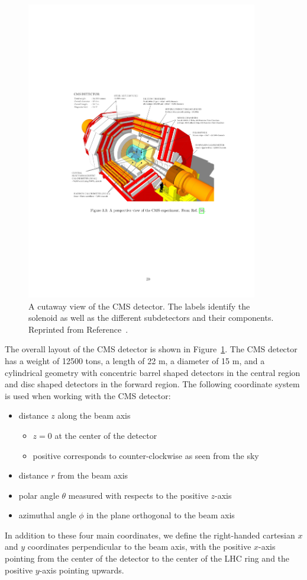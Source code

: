 \begin{figure}[htbp]
  \centering
  \includegraphics[width=0.9\textwidth]{Detector/Figures/cms_detector.pdf}
  \caption{
    A cutaway view of the CMS detector.
    The labels identify the solenoid as well as the different subdetectors and their components. 
    Reprinted from Reference~\cite{}. %
  }
  \label{fig:cms}
\end{figure}

The overall layout of the CMS detector is shown in Figure~\ref{fig:cms}. 
The CMS detector has a weight of 12500 tons, a length of 22 m, a diameter of 15 m, and a cylindrical geometry with concentric barrel shaped detectors in the central region and disc shaped detectors in the forward region.
The following coordinate system is used when working with the CMS detector:
\begin{itemize}
\item distance $z$ along the beam axis
  \begin{itemize}
  \item $z=0$ at the center of the detector
  \item positive corresponds to counter-clockwise as seen from the sky
  \end{itemize}
\item distance $r$ from the beam axis
\item polar angle $\theta$ measured with respects to the positive $z$-axis
\item azimuthal angle $\phi$ in the plane orthogonal to the beam axis
\end{itemize}
In addition to these four main coordinates, we define the right-handed cartesian $x$ and $y$ coordinates perpendicular to the beam axis, with the positive $x$-axis pointing from the center of the detector to the center of the LHC ring and the positive $y$-axis pointing upwards.


